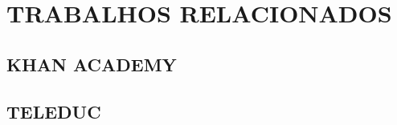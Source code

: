 \chapter{TRABALHOS RELACIONADOS}\label{chp:LABEL_CHP_2}

\section{KHAN ACADEMY}\label{sec:LABEL_CHP_2_SEC_A}

\section{TELEDUC}\label{sec:LABEL_CHP_2_SEC_A}
